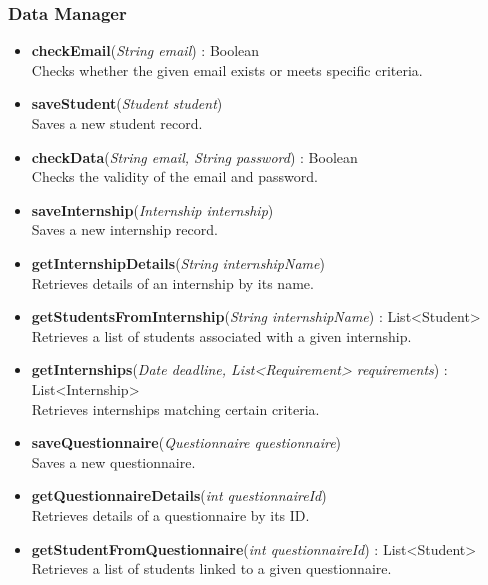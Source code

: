 \subsubsection*{Data Manager}
\begin{itemize}

    \item \textbf{checkEmail}(\textit{String email}) : Boolean \\
    Checks whether the given email exists or meets specific criteria.

    \item \textbf{saveStudent}(\textit{Student student}) \\
    Saves a new student record.

    \item \textbf{checkData}(\textit{String email, String password}) : Boolean \\
    Checks the validity of the email and password.

    \item \textbf{saveInternship}(\textit{Internship internship}) \\
    Saves a new internship record.

    \item \textbf{getInternshipDetails}(\textit{String internshipName}) \\
    Retrieves details of an internship by its name.

    \item \textbf{getStudentsFromInternship}(\textit{String internshipName}) : List<Student> \\
    Retrieves a list of students associated with a given internship.

    \item \textbf{getInternships}(\textit{Date deadline, List<Requirement> requirements}) : List<Internship> \\
    Retrieves internships matching certain criteria.

    \item \textbf{saveQuestionnaire}(\textit{Questionnaire questionnaire}) \\
    Saves a new questionnaire.

    \item \textbf{getQuestionnaireDetails}(\textit{int questionnaireId}) \\
    Retrieves details of a questionnaire by its ID.

    \item \textbf{getStudentFromQuestionnaire}(\textit{int questionnaireId}) : List<Student> \\
    Retrieves a list of students linked to a given questionnaire.


\end{itemize}
